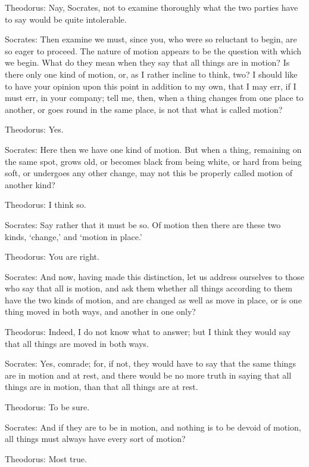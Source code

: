 Theodorus: Nay, Socrates, not to examine thoroughly what the two parties
have to say would be quite intolerable.

Socrates: Then examine we must, since you, who were so reluctant to
begin, are so eager to proceed. The nature of motion appears to be the
question with which we begin. What do they mean when they say that all
things are in motion? Is there only one kind of motion, or, as I rather
incline to think, two? I should like to have your opinion upon this
point in addition to my own, that I may err, if I must err, in your
company; tell me, then, when a thing changes from one place to another,
or goes round in the same place, is not that what is called motion?

Theodorus: Yes.

Socrates: Here then we have one kind of motion. But when a thing,
remaining on the same spot, grows old, or becomes black from being
white, or hard from being soft, or undergoes any other change, may not
this be properly called motion of another kind?

Theodorus: I think so.

Socrates: Say rather that it must be so. Of motion then there are these
two kinds, `change,' and `motion in place.'

Theodorus: You are right.

Socrates: And now, having made this distinction, let us address
ourselves to those who say that all is motion, and ask them whether all
things according to them have the two kinds of motion, and are changed
as well as move in place, or is one thing moved in both ways, and
another in one only?

Theodorus: Indeed, I do not know what to answer; but I think they would
say that all things are moved in both ways.

Socrates: Yes, comrade; for, if not, they would have to say that the
same things are in motion and at rest, and there would be no more truth
in saying that all things are in motion, than that all things are at
rest.

Theodorus: To be sure.

Socrates: And if they are to be in motion, and nothing is to be devoid
of motion, all things must always have every sort of motion?

Theodorus: Most true.

